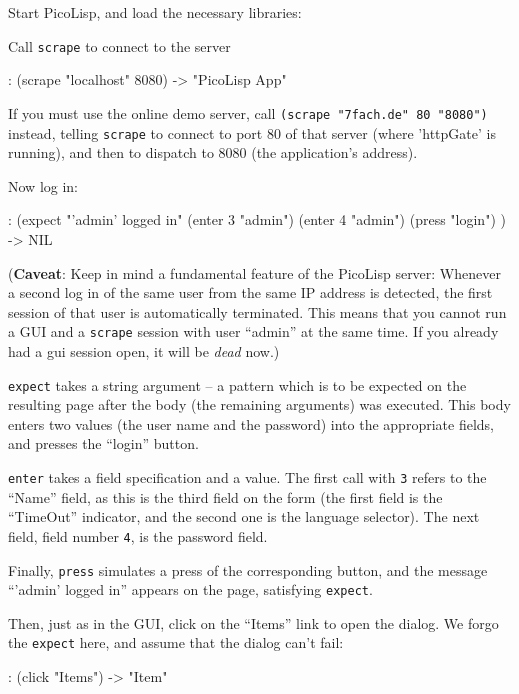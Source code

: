 Start PicoLisp, and load the necessary libraries:

Call \texttt{scrape} to connect to the server
\begin{wideverbatim}
   : (scrape "localhost" 8080)
   -> "PicoLisp App"
\end{wideverbatim}

If you must use the online demo server, call \texttt{(scrape
  "7fach.de" 80 "8080")} instead, telling \texttt{scrape} to connect
to port 80 of that server (where 'httpGate' is running), and then to
dispatch to 8080 (the application's address).

Now log in:
\begin{wideverbatim}
   : (expect "'admin' logged in"
      (enter 3 "admin")
      (enter 4 "admin")
      (press "login") )
   -> NIL
\end{wideverbatim}

(\textbf{Caveat}: Keep in mind a fundamental feature of the PicoLisp
server: Whenever a second log in of the same user from the same IP
address is detected, the first session of that user is automatically
terminated. This means that you cannot run a GUI and a \texttt{scrape}
session with user ``admin'' at the same time. If you already had a gui
session open, it will be \textit{dead} now.)

\texttt{expect} takes a string argument -- a pattern which is to be
expected on the resulting page after the body (the remaining
arguments) was executed. This body enters two values (the user name
and the password) into the appropriate fields, and presses the
``login'' button.

\texttt{enter} takes a field specification and a value. The first call
with \texttt{3} refers to the ``Name'' field, as this is the third
field on the form (the first field is the ``TimeOut'' indicator, and
the second one is the language selector). The next field, field number
\texttt{4}, is the password field.

Finally, \texttt{press} simulates a press of the corresponding button,
and the message ``'admin' logged in'' appears on the page, satisfying
\texttt{expect}.

Then, just as in the GUI, click on the ``Items'' link to open the
dialog. We forgo the \texttt{expect} here, and assume that the dialog
can't fail:

\begin{wideverbatim}
   : (click "Items")
   -> "Item"
\end{wideverbatim}

